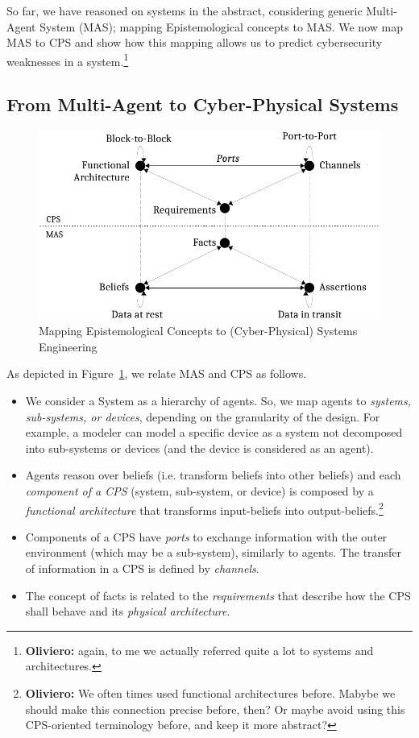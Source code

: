 \documentclass[conference]{IEEEtran}
\newcommand{\fixnote}[2]{\textbf{\color{red}{FIX}}\footnote{{\bf #1:} #2}}
\begin{document}
So far, we have reasoned on systems in the abstract, considering
generic Multi-Agent System (MAS); mapping Epistemological concepts
to MAS. We now map MAS to CPS and show how this mapping allows us
to predict cybersecurity weaknesses in a system.\fixnote{Oliviero}{again, to me we actually referred quite a lot to systems and architectures.}

\subsection{From Multi-Agent to Cyber-Physical Systems}
\begin{figure}[t]
	\centering
	\includegraphics[width=\columnwidth]{abftheory.pdf} %
	\caption{Mapping Epistemological Concepts to (Cyber-Physical) Systems Engineering}
	\label{fig:mashyp}
\end{figure}

As depicted in Figure~\ref{fig:mashyp}, we relate MAS and CPS as follows.
\begin{itemize}
	\item We consider a System as a hierarchy of agents. So, we map agents
		to \emph{systems, sub-systems, or devices}, depending on the
		granularity of the design. For example, a modeler can model a
		specific device as a system not decomposed into sub-systems or devices (and
		the device is considered as an agent).
	\item Agents reason over beliefs (i.e. transform beliefs into other
		beliefs) and each \emph{component of a CPS} (system, sub-system,
		or device) is composed by a \emph{functional architecture} that
		transforms input-beliefs into output-beliefs.\fixnote{Oliviero}{We often times used functional architectures before. Mabybe we should make this connection precise before, then? Or maybe avoid using this CPS-oriented terminology before, and keep it more abstract?}
	\item Components of a CPS have \emph{ports} to exchange information
		with the outer environment (which may be a sub-system),
		similarly to agents. The transfer of information in a CPS is
		defined by \emph{channels}.
	\item The concept of facts is related to the \emph{requirements}
		that describe how the CPS shall behave and
		its \emph{physical architecture}.

\end{itemize}
\end{document}
